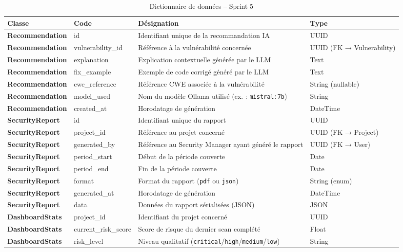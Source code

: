 \begin{table}[H]
\centering
\caption{Dictionnaire de données -- Sprint 5}
\label{tab:dict-sprint5}
\small
\renewcommand{\arraystretch}{1.3}
\begin{tabularx}{\textwidth}{>{\bfseries}p{2.8cm} p{3.2cm} X p{2.5cm}}
\hline
\rowcolor{gray!15}
\textbf{Classe} & \textbf{Code} & \textbf{Désignation} & \textbf{Type} \\
\hline
Recommendation & id & Identifiant unique de la recommandation IA & UUID \\
Recommendation & vulnerability\_id & Référence à la vulnérabilité concernée & UUID (FK → Vulnerability) \\
Recommendation & explanation & Explication contextuelle générée par le LLM & Text \\
Recommendation & fix\_example & Exemple de code corrigé généré par le LLM & Text \\
Recommendation & cwe\_reference & Référence CWE associée à la vulnérabilité & String (nullable) \\
Recommendation & model\_used & Nom du modèle Ollama utilisé (ex. : \texttt{mistral:7b}) & String \\
Recommendation & created\_at & Horodatage de génération & DateTime \\
\hline
SecurityReport & id & Identifiant unique du rapport & UUID \\
SecurityReport & project\_id & Référence au projet concerné & UUID (FK → Project) \\
SecurityReport & generated\_by & Référence au Security Manager ayant généré le rapport & UUID (FK → User) \\
SecurityReport & period\_start & Début de la période couverte & Date \\
SecurityReport & period\_end & Fin de la période couverte & Date \\
SecurityReport & format & Format du rapport (\texttt{pdf} ou \texttt{json}) & String (enum) \\
SecurityReport & generated\_at & Horodatage de génération & DateTime \\
SecurityReport & data & Données du rapport sérialisées (JSON) & JSON \\
\hline
DashboardStats & project\_id & Identifiant du projet concerné & UUID \\
DashboardStats & current\_risk\_score & Score de risque du dernier scan complété & Float \\
DashboardStats & risk\_level & Niveau qualitatif (\texttt{critical}/\texttt{high}/\texttt{medium}/\texttt{low}) & String \\

\end{tabularx}
\end{table}
